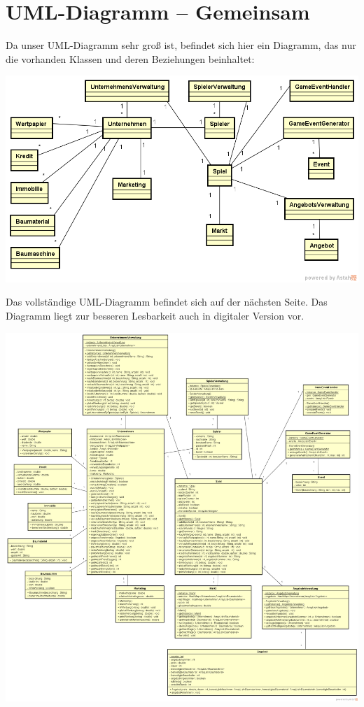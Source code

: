 \chapter{UML-Diagramm -- Gemeinsam}

Da unser UML-Diagramm sehr groß ist, befindet sich hier ein Diagramm, das nur die vorhanden Klassen und deren Beziehungen beinhaltet:

\begin{minipage}{\linewidth}
	\centering
	\includegraphics[scale=0.63]{img/ClassDiagramzweiteIterationFallstudieUEbersicht.png}
	\vspace{2em}
\end{minipage}

Das vollständige UML-Diagramm befindet sich auf der nächsten Seite. Das Diagramm liegt zur besseren Lesbarkeit auch in digitaler Version vor.

\begin{minipage}{\linewidth}
	\centering
	\includegraphics[scale=0.25]{img/ClassDiagramzweiteIterationFallstudie.png}
	\vspace{2em}
\end{minipage}